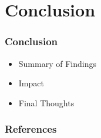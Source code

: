 \documentclass[
	10pt,
	t		%
]{beamer}
\begin{document}
\section{Conclusion}
\begin{frame}
	\frametitle{Conclusion}
	\begin{itemize}
		\item Summary of Findings
		\item Impact
		\item Final Thoughts
	\end{itemize}
\end{frame}

\begin{frame}[allowframebreaks]
	\frametitle{References}
	
	
\end{frame}
\end{document}
